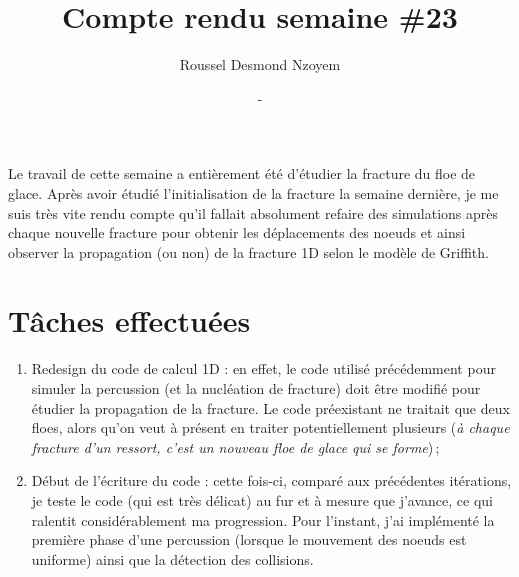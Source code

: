 \documentclass[
  french,
	11pt, %
]{fphw}
\title{\sf\bfseries Compte rendu semaine \#23} %
\author{Roussel Desmond Nzoyem} %
\date{\DTMdisplaydate{2021}{7}{07}{-1} - \DTMdisplaydate{2021}{7}{13}{-1}} %
\institute{Sorbonne Université \\ Laboratoire Jacques-Louis Lions} %
\begin{document}
\maketitle %


Le travail de cette semaine a entièrement été d'étudier la fracture du floe de glace. Après avoir étudié l'initialisation de la fracture la semaine dernière, je me suis très vite rendu compte qu'il fallait absolument refaire des simulations après chaque nouvelle fracture pour obtenir les déplacements des noeuds et ainsi observer la propagation (ou non) de la fracture 1D selon le modèle de Griffith.


\section*{Tâches effectuées}


\begin{enumerate}
  \item Redesign du code de calcul 1D : en effet, le code utilisé précédemment pour simuler la percussion (et la nucléation de fracture) doit être modifié pour étudier la propagation de la fracture. Le code préexistant ne traitait que deux floes, alors qu'on veut à présent en traiter potentiellement plusieurs (\emph{à chaque fracture d'un ressort, c'est un nouveau floe de glace qui se forme}) ;
  \item Début de l'écriture du code : cette fois-ci, comparé aux précédentes itérations, je teste le code (qui est très délicat) au fur et à mesure que j'avance, ce qui ralentit considérablement ma progression. Pour l'instant, j’ai implémenté la première phase d'une percussion (lorsque le mouvement des noeuds est uniforme) ainsi que la détection des collisions. 
\end{enumerate}


 
\end{document}
